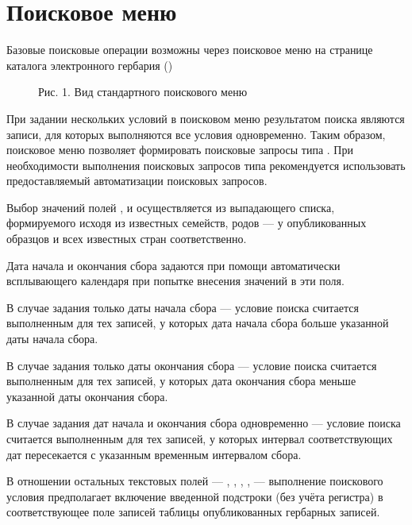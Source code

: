 \documentclass[letterpaper,10pt,russian]{sphinxmanual}
\begin{document}
\section{Поисковое меню}
\label{\detokenize{search_basics:id4}}
Базовые поисковые операции возможны через поисковое меню на странице каталога электронного гербария ({\hyperref[\detokenize{search_basics:fig1}]{}})

\ignorespaces 
\begin{figure}[htbp]
\centering
\capstart

\noindent{}
\caption{Рис. 1. Вид стандартного поискового меню}\label{\detokenize{search_basics:fig1}}\label{\detokenize{search_basics:id6}}\end{figure}

При задании нескольких условий в поисковом меню результатом поиска являются записи,
для которых выполняются все условия одновременно. Таким образом, поисковое меню позволяет
формировать поисковые запросы типа . При необходимости выполнения поисковых запросов
типа  рекомендуется использовать предоставляемый
{\hyperref[\detokenize{http_api::doc}]{}} автоматизации поисковых запросов.

Выбор значений полей ,  и  осуществляется из выпадающего списка,
формируемого исходя из известных  семейств, родов — у опубликованных
образцов и всех известных стран соответственно.

Дата начала и окончания сбора задаются при помощи автоматически
всплывающего календаря при попытке внесения значений в эти поля.

В случае задания только даты начала сбора — условие поиска считается выполненным для тех записей,
у которых дата начала сбора больше указанной даты начала сбора.

В случае задания только даты окончания сбора — условие поиска считается выполненным для
тех записей, у которых дата окончания сбора меньше указанной даты окончания сбора.

В случае задания дат начала и окончания сбора одновременно — условие поиска считается
выполненным для тех записей, у которых интервал соответствующих дат пересекается
с указанным временным интервалом сбора.

В отношении остальных текстовых полей —
, , , ,  —
выполнение поискового условия предполагает включение  введенной подстроки
(без учёта регистра) в соответствующее поле записей таблицы опубликованных гербарных записей.
\end{document}
